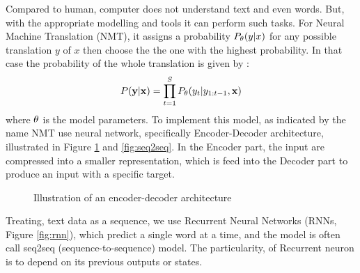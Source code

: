 Compared to human, computer does not understand text and even words. But, with the appropriate modelling and tools it can perform such tasks. For Neural Machine Translation (NMT), it assigns a probability  $P_{\mathbf{\theta}}(y|x)$ for any possible translation $y$ of $x$ then choose the the one with the highest probability. In that case the probability of the whole translation is given by :
\begin{equation}
P(\mathbf{y}|\mathbf{x})=\prod_{t=1}^S P_{\mathbf{\theta}}(y_t|y_{1:t-1}, \mathbf{x})
\end{equation}
where $\mathbf{\theta}$ is the model parameters.
To implement this model, as indicated by the name NMT use neural network, specifically Encoder-Decoder architecture, illustrated in Figure \ref{fig:enc-dec} and \ref{fig:seq2seq}. In the Encoder part, the input are compressed into a smaller representation, which is feed into the Decoder part to produce an input with a specific target.
\begin{figure}[H]
	\centering
{}
\caption{Illustration of an encoder-decoder architecture}
\label{fig:enc-dec}
\end{figure}
Treating, text data as a sequence, we use Recurrent Neural Networks (RNNs, Figure \ref{fig:rnn}), which predict a single word at a time, and the model is often call seq2seq (sequence-to-sequence) model. The particularity, of Recurrent neuron is to depend on its previous outputs or states.
